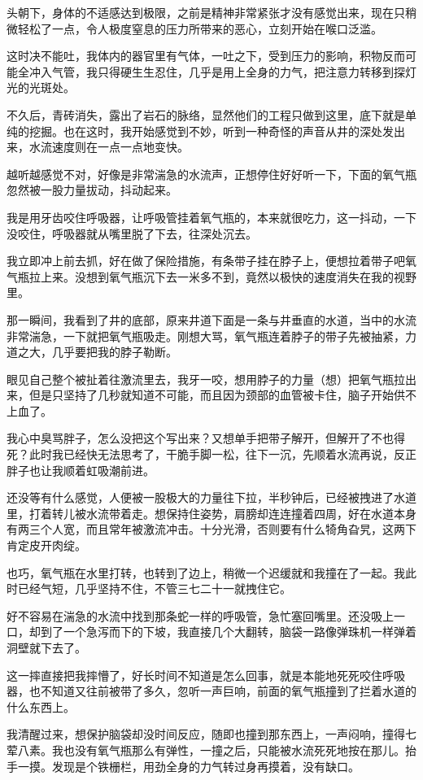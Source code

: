 头朝下，身体的不适感达到极限，之前是精神非常紧张才没有感觉出来，现在只稍微轻松了一点，令人极度窒息的压力所带来的恶心，立刻开始在喉口泛滥。

这时决不能吐，我体内的器官里有气体，一吐之下，受到压力的影响，积物反而可能全冲入气管，我只得硬生生忍住，几乎是用上全身的力气，把注意力转移到探灯光的光斑处。

不久后，青砖消失，露出了岩石的脉络，显然他们的工程只做到这里，底下就是单纯的挖掘。也在这时，我开始感觉到不妙，听到一种奇怪的声音从井的深处发出来，水流速度则在一点一点地变快。

越听越感觉不对，好像是非常湍急的水流声，正想停住好好听一下，下面的氧气瓶忽然被一股力量拔动，抖动起来。

我是用牙齿咬住呼吸器，让呼吸管挂着氧气瓶的，本来就很吃力，这一抖动，一下没咬住，呼吸器就从嘴里脱了下去，往深处沉去。

我立即冲上前去抓，好在做了保险措施，有条带子挂在脖子上，便想拉着带子吧氧气瓶拉上来。没想到氧气瓶沉下去一米多不到，竟然以极快的速度消失在我的视野里。

那一瞬间，我看到了井的底部，原来井道下面是一条与井垂直的水道，当中的水流非常湍急，一下就把氧气瓶吸走。刚想大骂，氧气瓶连着脖子的带子先被抽紧，力道之大，几乎要把我的脖子勒断。

眼见自己整个被扯着往激流里去，我牙一咬，想用脖子的力量（想）把氧气瓶拉出来，但是只坚持了几秒就知道不可能，而且因为颈部的血管被卡住，脑子开始供不上血了。

我心中臭骂胖子，怎么没把这个写出来？又想单手把带子解开，但解开了不也得死？此时我已经快无法思考了，干脆手脚一松，往下一沉，先顺着水流再说，反正胖子也让我顺着虹吸潮前进。

还没等有什么感觉，人便被一股极大的力量往下拉，半秒钟后，已经被拽进了水道里，打着转儿被水流带着走。想保持住姿势，肩膀却连连撞着四周，好在水道本身有两三个人宽，而且常年被激流冲击。十分光滑，否则要有什么犄角旮旯，这两下肯定皮开肉绽。

也巧，氧气瓶在水里打转，也转到了边上，稍微一个迟缓就和我撞在了一起。我此时已经气短，几乎坚持不住，不管三七二十一就拽住它。

好不容易在湍急的水流中找到那条蛇一样的呼吸管，急忙塞回嘴里。还没吸上一口，却到了一个急泻而下的下坡，我直接几个大翻转，脑袋一路像弹珠机一样弹着洞壁就下去了。

这一摔直接把我摔懵了，好长时间不知道是怎么回事，就是本能地死死咬住呼吸器，也不知道又往前被带了多久，忽听一声巨响，前面的氧气瓶撞到了拦着水道的什么东西上。

我清醒过来，想保护脑袋却没时间反应，随即也撞到那东西上，一声闷响，撞得七荤八素。我也没有氧气瓶那么有弹性，一撞之后，只能被水流死死地按在那儿。抬手一摸。发现是个铁栅栏，用劲全身的力气转过身再摸着，没有缺口。

